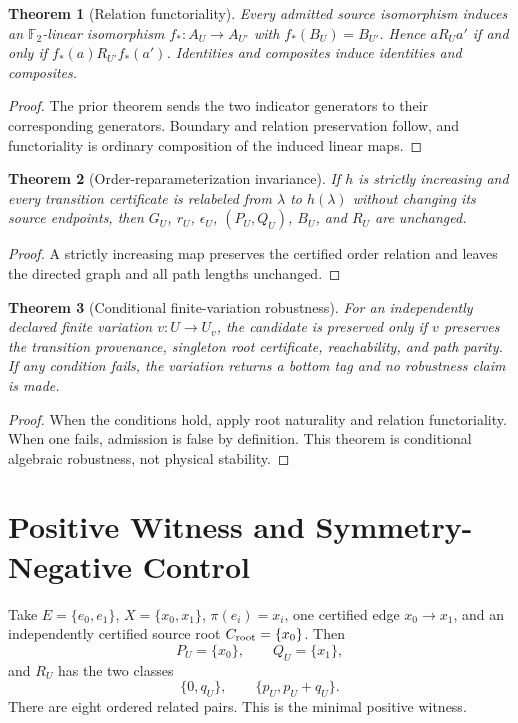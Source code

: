 \documentclass[11pt]{article}
\newtheorem{theorem}{Theorem}
\newcommand{\Ftwo}{\mathbb F_2}
\begin{document}
\begin{theorem}[Relation functoriality]
Every admitted source isomorphism induces an \(\Ftwo\)-linear isomorphism
\(f_*:A_U\to A_{U'}\) with \(f_*(B_U)=B_{U'}\). Hence
\(aR_Ua'\) if and only if \(f_*(a)R_{U'}f_*(a')\). Identities and
composites induce identities and composites.
\end{theorem}
\begin{proof}
The prior theorem sends the two indicator generators to their corresponding
generators. Boundary and relation preservation follow, and functoriality is
ordinary composition of the induced linear maps.
\end{proof}

\begin{theorem}[Order-reparameterization invariance]
If \(h\) is strictly increasing and every transition certificate is relabeled
from \(\lambda\) to \(h(\lambda)\) without changing its source endpoints,
then \(G_U\), \(r_U\), \(\epsilon_U\), \((P_U,Q_U)\), \(B_U\), and
\(R_U\) are unchanged.
\end{theorem}
\begin{proof}
A strictly increasing map preserves the certified order relation and leaves
the directed graph and all path lengths unchanged.
\end{proof}

\begin{theorem}[Conditional finite-variation robustness]
For an independently declared finite variation \(v:U\to U_v\), the candidate
is preserved only if \(v\) preserves the transition provenance, singleton
root certificate, reachability, and path parity. If any condition fails, the
variation returns a bottom tag and no robustness claim is made.
\end{theorem}
\begin{proof}
When the conditions hold, apply root naturality and relation functoriality.
When one fails, admission is false by definition. This theorem is conditional
algebraic robustness, not physical stability.
\end{proof}

\section{Positive Witness and Symmetry-Negative Control}

Take \(E=\{e_0,e_1\}\), \(X=\{x_0,x_1\}\),
\(\pi(e_i)=x_i\), one certified edge \(x_0\to x_1\), and an independently
certified source root \(C_{\rm root}=\{x_0\}\). Then
\[
 P_U=\{x_0\},\qquad Q_U=\{x_1\},
\]
and \(R_U\) has the two classes
\[
 \{0,q_U\},\qquad \{p_U,p_U+q_U\}.
\]
There are eight ordered related pairs. This is the minimal positive witness.
\end{document}
